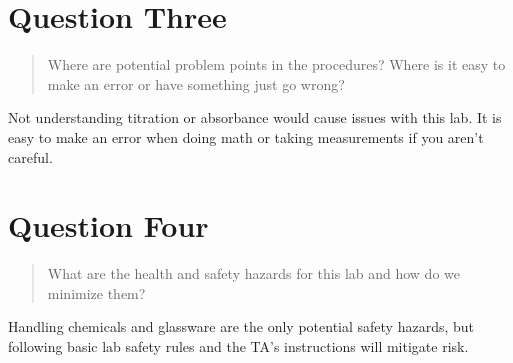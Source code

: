 \documentclass[11pt, letterpaper]{article}
\begin{document}
\section{Question Three}
\begin{quote}
    Where are potential problem points in the procedures? Where is it easy to make an error 
    or have something just go wrong?
\end{quote}
Not understanding titration or absorbance would cause issues with this lab.
It is easy to make an error when doing math or taking measurements if
you aren't careful.

\section{Question Four}
\begin{quote}
    What are the health and safety hazards for this lab and how do we minimize them?
\end{quote}
Handling chemicals and glassware are the only potential safety hazards,
but following basic lab safety rules and the TA's instructions will
mitigate risk.
\end{document}
